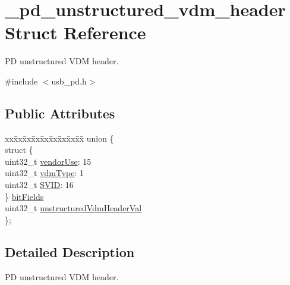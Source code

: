 \hypertarget{struct__pd__unstructured__vdm__header}{\section{\-\_\-pd\-\_\-unstructured\-\_\-vdm\-\_\-header Struct Reference}
\label{struct__pd__unstructured__vdm__header}
}


P\-D unstructured V\-D\-M header.  




{\ttfamily \#include $<$usb\-\_\-pd.\-h$>$}

\subsection*{Public Attributes}
\begin{DoxyCompactItemize}
\item 
\begin{tabbing}
xx\=xx\=xx\=xx\=xx\=xx\=xx\=xx\=xx\=\kill
union \{\\
\>struct \{\\
\>\>uint32\_t \hyperlink{struct__pd__unstructured__vdm__header_a2375bdcd908496f368cb35324d43912d}{vendorUse}: 15\\
\>\>uint32\_t \hyperlink{struct__pd__unstructured__vdm__header_a09d6bd908ac54c019051d53e2b12ab11}{vdmType}: 1\\
\>\>uint32\_t \hyperlink{struct__pd__unstructured__vdm__header_a9d9868b9f35518f7b5517340182095b9}{SVID}: 16\\
\>\} \hyperlink{struct__pd__unstructured__vdm__header_aebbb7159bc0e5a41e886be38105a0415}{bitFields}\\
\>uint32\_t \hyperlink{struct__pd__unstructured__vdm__header_aa0c6093c5429761509c65ae29a61e0a7}{unstructuredVdmHeaderVal}\\
\}; \\

\end{tabbing}\end{DoxyCompactItemize}


\subsection{Detailed Description}
P\-D unstructured V\-D\-M header. 

